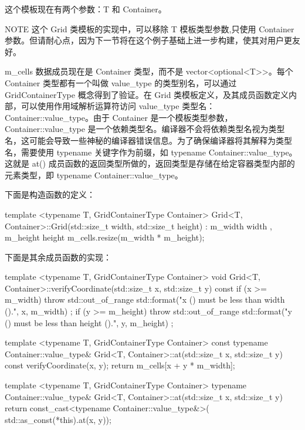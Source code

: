这个模板现在有两个参数：T 和 Container。

\begin{myNotic}{NOTE}
这个 Grid 类模板的实现中，可以移除 T 模板类型参数,只使用 Container 参数。但请耐心点，因为下一节将在这个例子基础上进一步构建，使其对用户更友好。
\end{myNotic}

m\_cells 数据成员现在是 Container 类型，而不是 vector<optional<T>{}>。每个 Container 类型都有一个叫做 value\_type 的类型别名，可以通过 GridContainerType 概念得到了验证。在 Grid 类模板定义，及其成员函数定义内部，可以使用作用域解析运算符访问 value\_type 类型名：Container::value\_type。由于 Container 是一个模板类型参数，Container::value\_type 是一个依赖类型名。编译器不会将依赖类型名视为类型名，这可能会导致一些神秘的编译器错误信息。为了确保编译器将其解释为类型名，需要使用 typename 关键字作为前缀，如 typename Container::value\_type。这就是 at() 成员函数的返回类型所做的，返回类型是存储在给定容器类型内部的元素类型，即 typename Container::value\_type。

下面是构造函数的定义：

\begin{cpp}
template <typename T, GridContainerType Container>
Grid<T, Container>::Grid(std::size_t width, std::size_t height)
    : m_width { width }, m_height { height }
{
    m_cells.resize(m_width * m_height);
}
\end{cpp}

下面是其余成员函数的实现：

\begin{cpp}
template <typename T, GridContainerType Container>
void Grid<T, Container>::verifyCoordinate(std::size_t x, std::size_t y) const
{
    if (x >= m_width) {
        throw std::out_of_range {
            std::format("x ({}) must be less than width ({}).", x, m_width) };
    }
    if (y >= m_height) {
        throw std::out_of_range {
            std::format("y ({}) must be less than height ({}).", y, m_height) };
    }
}

template <typename T, GridContainerType Container>
const typename Container::value_type&
    Grid<T, Container>::at(std::size_t x, std::size_t y) const
{
    verifyCoordinate(x, y);
    return m_cells[x + y * m_width];
}

template <typename T, GridContainerType Container>
typename Container::value_type&
    Grid<T, Container>::at(std::size_t x, std::size_t y)
{
    return const_cast<typename Container::value_type&>(
        std::as_const(*this).at(x, y));
}
\end{cpp}

